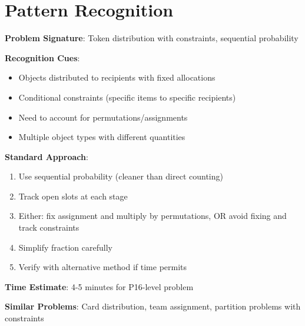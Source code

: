\documentclass[12pt]{article}
\begin{document}
\section*{Pattern Recognition}

\textbf{Problem Signature}: Token distribution with constraints, sequential probability

\textbf{Recognition Cues}:
\begin{itemize}
    \item Objects distributed to recipients with fixed allocations
    \item Conditional constraints (specific items to specific recipients)
    \item Need to account for permutations/assignments
    \item Multiple object types with different quantities
\end{itemize}

\textbf{Standard Approach}:
\begin{enumerate}
    \item Use sequential probability (cleaner than direct counting)
    \item Track open slots at each stage
    \item Either: fix assignment and multiply by permutations, OR avoid fixing and track constraints
    \item Simplify fraction carefully
    \item Verify with alternative method if time permits
\end{enumerate}

\textbf{Time Estimate}: 4-5 minutes for P16-level problem

\textbf{Similar Problems}: Card distribution, team assignment, partition problems with constraints
\end{document}
